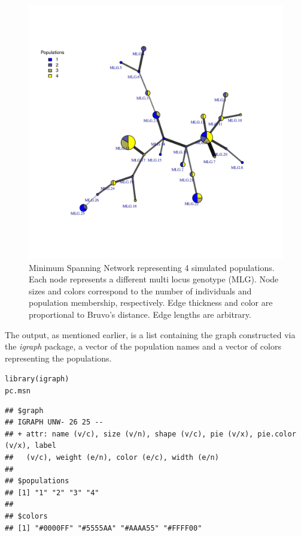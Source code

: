 \documentclass[letterpaper]{article}\usepackage[]{graphicx}\usepackage[]{color}
\makeatletter
\newcommand{\hlstd}[1]{\textcolor[rgb]{0,0,0}{#1}}%
\newcommand{\hlkwd}[1]{\textcolor[rgb]{0,0.267,0.4}{#1}}%
\newenvironment{kframe}{%
 \def\at@end@of@kframe{}%
 \ifinner\ifhmode%
  \def\at@end@of@kframe{\end{minipage}}%
  \begin{minipage}{\columnwidth}%
 \fi\fi%
 \def\FrameCommand##1{\hskip\@totalleftmargin \hskip-\fboxsep
 \colorbox{shadecolor}{##1}\hskip-\fboxsep
     \hskip-\linewidth \hskip-\@totalleftmargin \hskip\columnwidth}%
 \MakeFramed {\advance\hsize-\width
   \@totalleftmargin\z@ \linewidth\hsize
   \@setminipage}}%
 {\par\unskip\endMakeFramed%
 \at@end@of@kframe}
\newenvironment{knitrout}{}{} %
\makeatother
\begin{document}
\begin{figure}[ht!]
  \centering
  \caption{\footnotesize Minimum Spanning Network representing 4 simulated populations. Each node represents a different multi locus genotype (MLG). Node sizes and colors correspond to the number of individuals and population membership, respectively. Edge thickness and color are proportional to Bruvo's distance. Edge lengths are arbitrary.}
  \label{mst_bruvo}
\begin{knitrout}\footnotesize
{}\color{fgcolor}

{\centering \includegraphics[width=0.8\linewidth]{figure/bruvo_msn} 

}



\end{knitrout}

\end{figure}

The output, as mentioned earlier, is a list containing the graph constructed via the \textit{igraph} package, a vector of the population names and a vector of colors representing the populations.
\begin{knitrout}\footnotesize
{}\color{fgcolor}\begin{kframe}
\begin{alltt}
\hlkwd{library}\hlstd{(igraph)}
\hlstd{pc.msn}
\end{alltt}
\begin{verbatim}
## $graph
## IGRAPH UNW- 26 25 -- 
## + attr: name (v/c), size (v/n), shape (v/c), pie (v/x), pie.color (v/x), label
##   (v/c), weight (e/n), color (e/c), width (e/n)
## 
## $populations
## [1] "1" "2" "3" "4"
## 
## $colors
## [1] "#0000FF" "#5555AA" "#AAAA55" "#FFFF00"
\end{verbatim}
\end{kframe}
\end{knitrout}
\end{document}
